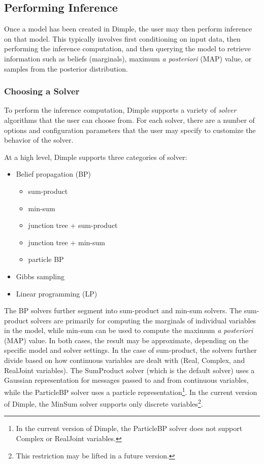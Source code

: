 \subsection{Performing Inference}

Once a model has been created in Dimple, the user may then perform inference on that model.  This typically involves first conditioning on input data, then performing the inference computation, and then querying the model to retrieve information such as beliefs (marginals), maximum \emph{a posteriori} (MAP) value, or samples from the posterior distribution.

\subsubsection{Choosing a Solver}
\label{sec:Solvers}

To perform the inference computation, Dimple supports a variety of \emph{solver} algorithms that the user can choose from.  For each solver, there are a number of options and configuration parameters that the user may specify to customize the behavior of the solver.

At a high level, Dimple supports three categories of solver:

\begin{itemize}
\item Belief propagation (BP)
 \begin{itemize}
 \item sum-product
 \item min-sum
 \item junction tree + sum-product
 \item junction tree + min-sum
 \item particle BP
 \end{itemize}
\item Gibbs sampling
\item Linear programming (LP)
\end{itemize}

The BP solvers further segment into sum-product and min-sum solvers.  The sum-product solvers are primarily for computing the marginals of individual variables in the model, while min-sum can be used to compute the maximum \emph{a posteriori} (MAP) value.  In both cases, the result may be approximate, depending on the specific model and solver settings. In the case of sum-product, the solvers further divide based on how continuous variables are dealt with (Real, Complex, and RealJoint variables).  The SumProduct solver (which is the default solver) uses a Gaussian representation for messages passed to and from continuous variables, while the ParticleBP solver uses a particle representation\footnote{In the current version of Dimple, the ParticleBP solver does not support Complex or RealJoint variables.}.  In the current version of Dimple, the MinSum solver supports only discrete variables\footnote{This restriction may be lifted in a future version.}.

